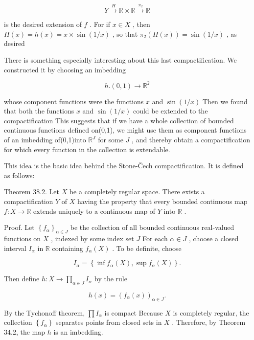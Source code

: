\[
Y\overset{H}{ \rightarrow  }\mathbb{R} \times  \mathbb{R}\overset{{\pi }_{2}}{ \rightarrow  }\mathbb{R}
\]

is the desired extension of \(f\) . For if \(x \in  X\) , then \(H\left( x\right)  = h\left( x\right)  = x \times  \sin \left( {1/x}\right)\) , so that \({\pi }_{2}\left( {H\left( x\right) }\right)  = \sin \left( {1/x}\right)\) , as desired

There is something especially interesting about this last compactification. We constructed it by choosing an imbedding

\[
h.\left( {0,1}\right)  \rightarrow  {\mathbb{R}}^{2}
\]

whose component functions were the functions \(x\) and \(\sin \left( {1/x}\right)\) Then we found that both the functions \(x\) and \(\sin \left( {1/x}\right)\) could be extended to the compactification This suggests that if we have a whole collection of bounded continuous functions defined on(0,1), we might use them as component functions of an imbedding of(0,1)into \({\mathbb{R}}^{J}\) for some \(J\) , and thereby obtain a compactification for which every function in the collection is extendable.

This idea is the basic idea behind the Stone-Čech compactification. It is defined as follows:

Theorem 38.2. Let \(X\) be a completely regular space. There exists a compactification \(Y\) of \(X\) having the property that every bounded continuous map \(f : X \rightarrow  \mathbb{R}\) extends uniquely to a continuous map of \(Y\) into \(\mathbb{R}\) .

Proof. Let \({\left\{  {f}_{\alpha }\right\}  }_{\alpha  \in  J}\) be the collection of all bounded continuous real-valued functions on \(X\) , indexed by some index set \(J\) For each \(\alpha  \in  J\) , choose a closed interval \({I}_{\alpha }\) in \(\mathbb{R}\) containing \({f}_{\alpha }\left( X\right)\) . To be definite, choose

\[
{I}_{\alpha } = \left\{  {\inf {f}_{\alpha }\left( X\right) ,\sup {f}_{\alpha }\left( X\right) }\right\}  .
\]

Then define \(h : X \rightarrow  \mathop{\prod }\limits_{{\alpha  \in  J}}{I}_{\alpha }\) by the rule

\[
h\left( x\right)  = {\left( {f}_{\alpha }\left( x\right) \right) }_{\alpha  \in  J}.
\]

By the Tychonoff theorem, \(\prod {I}_{\alpha }\) is compact Because \(X\) is completely regular, the collection \(\left\{  {f}_{\alpha }\right\}\) separates points from closed sets in \(X\) . Therefore, by Theorem 34.2, the map \(h\) is an imbedding.

